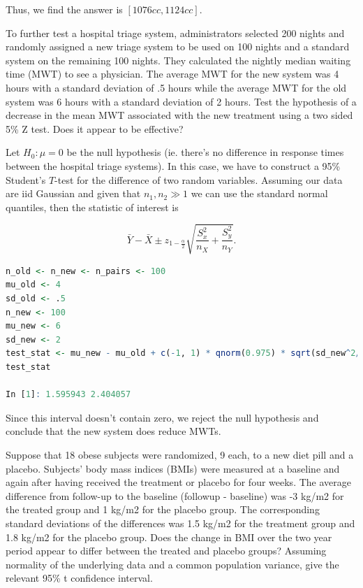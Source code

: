 \documentclass{homework}
\begin{document}
Thus, we find the answer is $[1076cc, 1124 cc]$. 

\clearpage

\begin{tcolorbox}[title=Question 4]
To further test a hospital triage system, administrators selected 200 nights and randomly assigned a new triage system to be used on 100 nights and a standard system on the remaining 100 nights. They calculated the nightly median waiting time (MWT) to see a physician. The average MWT for the new system was 4 hours with a standard deviation of .5 hours while the average MWT for the old system was 6 hours with a standard deviation of 2 hours. Test the hypothesis of a decrease in the mean MWT associated with the new treatment using a two sided 5\% Z test. Does it appear to be effective?
\end{tcolorbox}

Let $H_0: \mu = 0$ be the null hypothesis (ie. there's no difference in response times between the hospital triage systems). In this case, we have to construct a 95\% Student's $T$-test for the difference of two random variables. Assuming our data are iid Gaussian and given that $n_1, n_2 \gg 1$ we can use the standard normal quantiles, then the statistic of interest is 

$$
\bar{Y}-\bar{X}\pm z_{1-\frac{\alpha}{2}} \sqrt{\frac{S_x^2}{n_X}+\frac{S_y^2}{n_Y}}.
$$

\begin{lstlisting}[language=R]
n_old <- n_new <- n_pairs <- 100
mu_old <- 4
sd_old <- .5 
n_new <- 100
mu_new <- 6
sd_new <- 2
test_stat <- mu_new - mu_old + c(-1, 1) * qnorm(0.975) * sqrt(sd_new^2/n_new + sd_old^2/n_old)
test_stat

In [1]: 1.595943 2.404057
\end{lstlisting}

Since this interval doesn't contain zero, we reject the null hypothesis and conclude that the new system does reduce MWTs. \\

\begin{tcolorbox}[title=Question 5]
Suppose that 18 obese subjects were randomized, 9 each, to a new diet pill and a placebo. Subjects’ body mass indices (BMIs) were measured at a baseline and again after having received the treatment or placebo for four weeks. The average difference from follow-up to the baseline (followup - baseline) was -3 kg/m2 for the treated group and 1 kg/m2 for the placebo group. The corresponding standard deviations of the differences was 1.5 kg/m2 for the treatment group and 1.8 kg/m2 for the placebo group. Does the change in BMI over the two year period appear to differ between the treated and placebo groups?  Assuming normality of the underlying data and a common population variance, give the relevant 95\% t confidence interval.
\end{tcolorbox}
\end{document}
